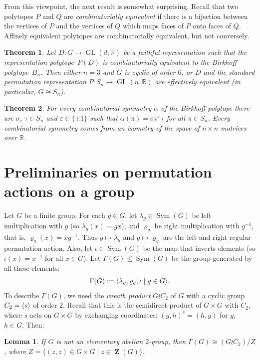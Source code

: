 \documentclass[10pt]{amsart}
\newtheorem{introthm}{Theorem}
\newtheorem{lemma}{Lemma}[section]
\newcommand{\eps}{\varepsilon}
\renewcommand{\rho}{\varrho}
\renewcommand{\leq}{\leqslant}
\newcommand{\reals}{\mathbb{R}}
\newcommand{\iso}{\cong}
\newcommand{\Sym}[1]{\operatorname{Sym}(#1)}
\DeclarePairedDelimiter{\erz}{\langle}{\rangle}
\DeclareMathOperator{\GL}{GL}
\DeclareMathOperator{\Zentr}{\mathbf{Z}}
\begin{document}
From this viewpoint, the next result is somewhat surprising.
Recall that two polytopes 
$P$ and $Q$ are
\emph{combinatorially equivalent}
if there is a bijection between the vertices of $P$
and the vertices of $Q$ which maps faces of $P$
onto faces of $Q$.
Affinely equivalent polytopes are combinatorially equivalent,
but not conversely.
\begin{introthm}\label{main:birkhoff_unique}
  Let $D\colon G\to \GL(d,\reals)$ be 
  a faithful representation such that
  the representation polytope~$P(D)$ is combinatorially equivalent
  to the Birkhoff polytope~$B_n$.
  Then either $n=3$ and $G$ is cyclic of order $6$,
  or $D$ and the standard permutation representation
  $P\colon S_n \to \GL(n,\reals)$ 
  are effectively equivalent  
  (in particular, $G\iso S_n$).
\end{introthm}
\begin{introthm}\label{main:birkhoff_symgrp}
  For every combinatorial symmetry $\alpha$ of 
  the Birkhoff polytope 
  there are $\sigma$, $\tau\in S_n$ and $\eps\in \{\pm 1\}$
  such that $\alpha(\pi)= \sigma \pi^{\eps} \tau$
  for all $\pi\in S_n$.  
  Every combinatorial symmetry comes from an isometry of
  the space of $n\times n$ matrices over $\reals$.
\end{introthm}
\section{Preliminaries on permutation actions on a group}
Let $G$ be a finite group.
For each $g\in G$, let $\lambda_g\in \Sym{G}$ 
be left multiplication with $g$
(so $\lambda_g(x)= gx$),
and $\rho_g$ be right multiplication
with $g^{-1}$, that is, $\rho_g(x)= xg^{-1}$.
Thus $g\mapsto \lambda_g$ and $g\mapsto \rho_g$ are 
the left and right regular permutation action.
Also, let $\iota\in \Sym{G}$ be the map that 
inverts elements (so $\iota(x)= x^{-1}$ for all $x\in G$).
Let $\Gamma(G)\leq \Sym{G}$ be the group generated by all these
elements:
\[ \Gamma(G):= \erz{\lambda_g, \rho_g, \iota
                   \mid g\in G}.
\]
To describe $\Gamma(G)$, we need the
\emph{wreath product} $G\wr C_2$ 
of $G$ with a cyclic group~$C_2=\erz{s}$
of order $2$.
Recall that this is the semidirect product of
$G\times G$ with $C_2$, where $s$ acts on 
$G\times G$ by exchanging coordinates:
$(g,h)^s = (h,g)$ for $g$, $h\in G$.
Then:

\begin{lemma}
  If $G$ is not an elementary abelian $2$-group,
  then $\Gamma(G) \iso (G\wr C_2)/Z$,
  where $Z = \{(z,z)\in G \times G \mid z \in \Zentr(G)\}$.
\end{lemma}
\end{document}
